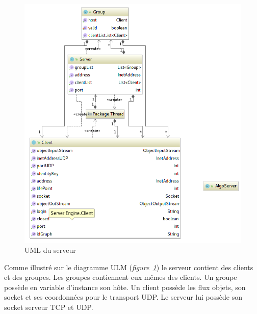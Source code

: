 \documentclass[a4paper, titlepage]{livret}
\begin{document}
    \begin{figure}[th]
      \begin{center}
        \includegraphics[scale=0.3]{Assets/UML_serveur.png}
        \caption{UML du serveur}
        \label{UML du serveur}
      \end{center}
    \end{figure}
    
    
    Comme illustré sur le diagramme ULM (\textit{figure~\ref{UML du serveur}}) le serveur contient des clients et des groupes. Les groupes contiennent eux mêmes des clients. Un groupe possède en variable d’instance son hôte. Un client possède les flux objets, son socket et ses coordonnées pour le transport UDP. Le serveur lui possède son socket serveur TCP et UDP.
\end{document}
